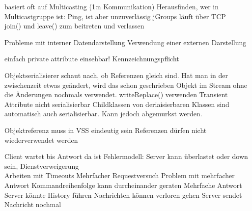 \documentclass[ngerman,a4paper,12pt]{scrreprt}
\begin{document}

\ul
	\li basiert oft auf Multicasting (1:n Kommunikation)
	\li Herausfinden, wer in Multicastgruppe ist: Ping, ist aber unzuverlässig
	\li jGroups läuft über TCP\\
		join() und leave() zum beitreten und verlassen
\ulE
{}


Probleme mit interner Datendarstellung \ra Verwendung einer externen Darstellung

\ul
	\li einfach
	\li private attribute einsehbar! \ra Kennzeichnungspflicht
\ulE


\ul
	\li Objektserialisierer schaut nach, ob Referenzen gleich sind. Hat man in der zwischenzeit etwas geändert, wird das schon geschrieben Objekt im Stream ohne die Änderungen nochmals verwendet. \ra writeReplace() verwenden
	\li Transient Attribute nicht serialisierbar
	\li Childklassen von deriaisierbaren Klassen sind automatisch auch serialisierbar. Kann jedoch abgemurkst werden.
\ulE


\ul
	\li Objektreferenz muss in VSS eindeutig sein
	\li Referenzen dürfen nicht wiederverwendet werden
	
\ulE
{}


\ul
	\li Client wartet bis Antwort da ist
	\li Fehlermodell: 
		\ul
			\li Server kann überlastet oder down sein, Dienstverweigerung \\
				\ul
					\li Arbeiten mit Timeouts
					\li Mehrfacher Requestversuch \ra Problem mit mehrfacher Antwort
				\ulE
			\li Kommandreihenfolge kann durcheinander geraten
			\li Mehrfache Antwort \ra Server könnte History führen
			\li Nachrichten können verloren gehen \ra Server sendet Nachricht nochmal
		\ulE
\ulE
{}
\end{document}

